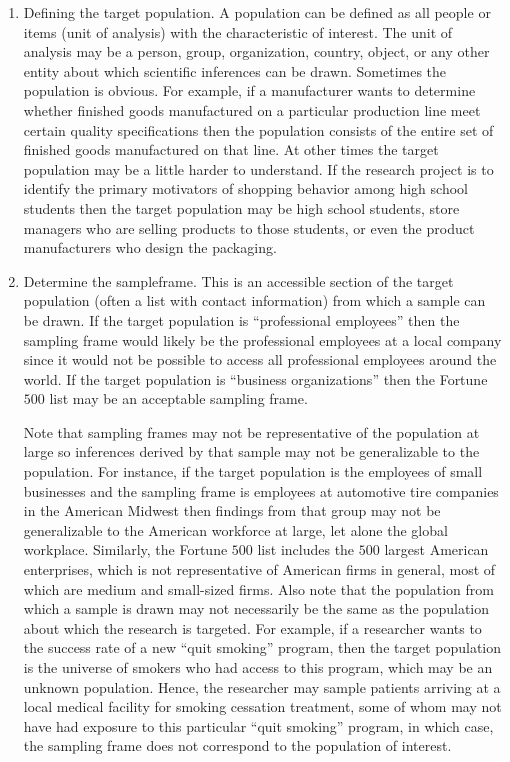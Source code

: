 \begin{enumerate}
	\item Defining the target population. A population can be defined as all people or items (unit of analysis) with the characteristic of interest. The unit of analysis may be a person, group, organization, country, object, or any other entity about which scientific inferences can be drawn. Sometimes the population is obvious. For example, if a manufacturer wants to determine whether finished goods manufactured on a particular production line meet certain quality specifications then the population consists of the entire set of finished goods manufactured on that line. At other times the target population may be a little harder to understand. If the research project is to identify the primary motivators of shopping behavior among high school students then the target population may be high school students, store managers who are selling products to those students, or even the product manufacturers who design the packaging. 

	\item Determine the \gls{sampleframe}. This is an accessible section of the target population (often a list with contact information) from which a sample can be drawn. If the target population is ``professional employees'' then the sampling frame would likely be the professional employees at a local company since it would not be possible to access all professional employees around the world. If the target population is ``business organizations'' then the Fortune $ 500 $ list may be an acceptable sampling frame.

	Note that sampling frames may not be representative of the population at large so inferences derived by that sample may not be generalizable to the population. For instance, if the target population is the employees of small businesses and the sampling frame is employees at automotive tire companies in the American Midwest then findings from that group may not be generalizable to the American workforce at large, let alone the global workplace. Similarly, the Fortune $ 500 $ list includes the $ 500 $ largest American enterprises, which is not representative of American firms in general, most of which are medium and small-sized firms. Also note that the population from which a sample is drawn may not necessarily be the same as the population about which the research is targeted. For example, if a researcher wants to the success rate of a new ``quit smoking'' program, then the target population is the universe of smokers who had access to this program, which may be an unknown population. Hence, the researcher may sample patients arriving at a local medical facility for smoking cessation treatment, some of whom may not have had exposure to this particular ``quit smoking'' program, in which case, the sampling frame does not correspond to the population of interest.


\end{enumerate}
